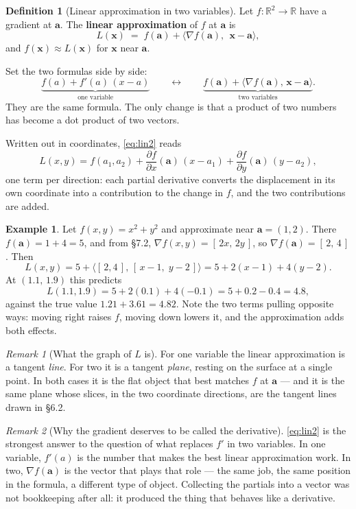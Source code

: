 \documentclass[11pt]{article}
\theoremstyle{plain}
\theoremstyle{definition}
\newtheorem{defn}{Definition}[section]
\newtheorem{ex}{Example}[section]
\theoremstyle{remark}
\newtheorem*{rmk}{Remark}
\newcommand{\R}{\mathbb{R}}
\newcommand{\vc}[1]{\mathbf{#1}}
\newcommand{\ip}[2]{\langle #1,\, #2\rangle}
\newcommand{\grad}{\nabla}
\newcommand{\pd}[2]{\frac{\partial #1}{\partial #2}}
\begin{document}
\begin{defn}[Linear approximation in two variables]
Let $f:\R^{2}\to\R$ have a gradient at $\vc{a}$. The \textbf{linear
approximation} of $f$ at $\vc{a}$ is
\begin{equation}\label{eq:lin2}
  L(\vc{x}) \;=\; f(\vc{a}) + \ip{\grad f(\vc{a})}{\;\vc{x}-\vc{a}} ,
\end{equation}
and $f(\vc{x})\approx L(\vc{x})$ for $\vc{x}$ near $\vc{a}$.
\end{defn}

\noindent Set the two formulas side by side:
\[
  \underbrace{f(a) + f'(a)\,(x-a)}_{\text{one variable}}
  \qquad\longleftrightarrow\qquad
  \underbrace{f(\vc{a}) + \ip{\grad f(\vc{a})}{\vc{x}-\vc{a}}}_{\text{two variables}} .
\]
They are the same formula. The only change is that a product of two numbers has
become a dot product of two vectors.

Written out in coordinates, \eqref{eq:lin2} reads
\[
  L(x,y) = f(a_1,a_2)
    + \pd{f}{x}(\vc{a})\,(x-a_1)
    + \pd{f}{y}(\vc{a})\,(y-a_2) ,
\]
one term per direction: each partial derivative converts the displacement in its
own coordinate into a contribution to the change in $f$, and the two
contributions are added.

\begin{ex}
Let $f(x,y)=x^{2}+y^{2}$ and approximate near $\vc{a}=(1,2)$. There
$f(\vc{a})=1+4=5$, and from \S7.2, $\grad f(x,y)=[\,2x,\,2y\,]$, so
$\grad f(\vc{a})=[\,2,\,4\,]$. Then
\[
  L(x,y) = 5 + \bigl\langle[\,2,4\,],\,[\,x-1,\;y-2\,]\bigr\rangle
         = 5 + 2(x-1) + 4(y-2) .
\]
At $(1.1,\,1.9)$ this predicts
\[
  L(1.1,1.9) = 5 + 2(0.1) + 4(-0.1) = 5 + 0.2 - 0.4 = 4.8 ,
\]
against the true value $1.21+3.61=4.82$. Note the two terms pulling opposite
ways: moving right raises $f$, moving down lowers it, and the approximation adds
both effects.
\end{ex}

\begin{rmk}[What the graph of $L$ is]
For one variable the linear approximation is a tangent \emph{line}. For two it
is a tangent \emph{plane}, resting on the surface at a single point. In both
cases it is the flat object that best matches $f$ at $\vc{a}$ --- and it is the
same plane whose slices, in the two coordinate directions, are the tangent lines
drawn in \S6.2.
\end{rmk}

\begin{rmk}[Why the gradient deserves to be called the derivative]
\eqref{eq:lin2} is the strongest answer to the question of what replaces $f'$ in
two variables. In one variable, $f'(a)$ is the number that makes the best linear
approximation work. In two, $\grad f(\vc{a})$ is the vector that plays that role
--- the same job, the same position in the formula, a different type of object.
Collecting the partials into a vector was not bookkeeping after all: it produced
the thing that behaves like a derivative.
\end{rmk}
\end{document}
